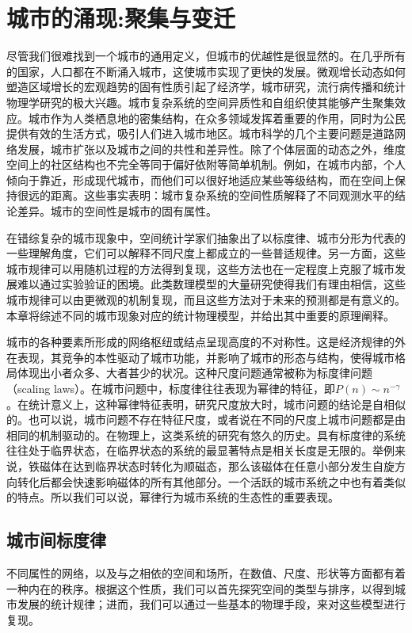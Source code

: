 \chapter{城市的涌现:聚集与变迁}

尽管我们很难找到一个城市的通用定义，但城市的优越性是很显然的。在几乎所有的国家，人口都在不断涌入城市，这使城市实现了更快的发展。微观增长动态如何塑造区域增长的宏观趋势的固有性质引起了经济学，城市研究，流行病传播和统计物理学研究的极大兴趣。城市复杂系统的空间异质性和自组织使其能够产生聚集效应\cite{Keuschnigg13759}。城市作为人类栖息地的密集结构，在众多领域发挥着重要的作用，同时为公民提供有效的生活方式，吸引人们进入城市地区。城市科学的几个主要问题是道路网络发展，城市扩张以及城市之间的共性和差异性。除了个体层面的动态之外，维度空间上的社区结构也不完全等同于偏好依附等简单机制。例如，在城市内部，个人倾向于靠近，形成现代城市，而他们可以很好地适应某些等级结构，而在空间上保持很远的距离。这些事实表明：城市复杂系统的空间性质解释了不同观测水平的结论差异。城市的空间性是城市的固有属性。

在错综复杂的城市现象中，空间统计学家们抽象出了以标度律、城市分形为代表的一些理解角度，它们可以解释不同尺度上都成立的一些普适规律。另一方面，这些城市规律可以用随机过程的方法得到复现，这些方法也在一定程度上克服了城市发展难以通过实验验证的困境。此类数理模型的大量研究使得我们有理由相信，这些城市规律可以由更微观的机制复现，而且这些方法对于未来的预测都是有意义的。本章将综述不同的城市现象对应的统计物理模型，并给出其中重要的原理阐释。

城市的各种要素所形成的网络枢纽或结点呈现高度的不对称性。这是经济规律的外在表现\cite{BerryThe}，其竞争的本性驱动了城市功能，并影响了城市的形态与结构，使得城市格局体现出小者众多、大者甚少的状况。这种尺度问题通常被称为标度律问题（scaling laws）。在城市问题中，标度律往往表现为幂律的特征，即$P(n)\sim n^{-\gamma}$。在统计意义上，这种幂律特征表明，研究尺度放大时，城市问题的结论是自相似的。也可以说，城市问题不存在特征尺度，或者说在不同的尺度上城市问题都是由相同的机制驱动的。在物理上，这类系统的研究有悠久的历史。具有标度律的系统往往处于临界状态，在临界状态的系统的最显著特点是相关长度是无限的。举例来说，铁磁体在达到临界状态时转化为顺磁态，那么该磁体在任意小部分发生自旋方向转化后都会快速影响磁体的所有其他部分。一个活跃的城市系统之中也有着类似的特点。所以我们可以说，幂律行为城市系统的生态性的重要表现。

\section{城市间标度律}

不同属性的网络，以及与之相依的空间和场所，在数值、尺度、形状等方面都有着一种内在的秩序。根据这个性质，我们可以首先探究空间的类型与排序，以得到城市发展的统计规律；进而，我们可以通过一些基本的物理手段，来对这些模型进行复现。

